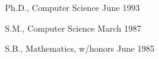 

\begin{cventries}


  \cventryB
    {Ph.D., Computer Science}
    {June 1993}

  \cventryB
    {S.M., Computer Science}
    {March 1987}
    
  \cventryB
    {S.B., Mathematics, w/honors}
    {June 1985}
   
\end{cventries}
